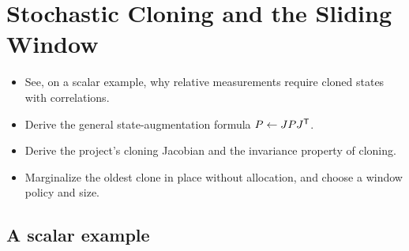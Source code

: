 \chapter{Stochastic Cloning and the Sliding Window}
\label{ch:cloning}

\begin{objectives}
\begin{itemize}
  \item See, on a scalar example, why relative measurements require cloned states with correlations.
  \item Derive the general state-augmentation formula $P \gets JPJ^{\mathsf{T}}$.
  \item Derive the project's cloning Jacobian and the invariance property of cloning.
  \item Marginalize the oldest clone in place without allocation, and choose a window policy and size.
\end{itemize}
\end{objectives}

\section{A scalar example}


